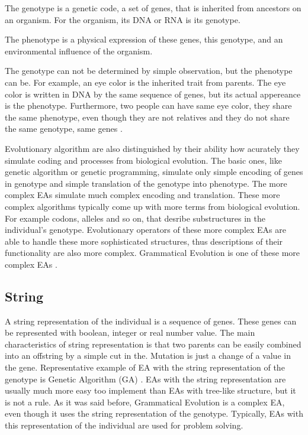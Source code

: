 The genotype is a genetic code, a set of genes, that is inherited from ancestors on an organism. For the organism, its DNA or RNA is its genotype.

The phenotype is a physical expression of these genes, this genotype, and an environmental influence of the organism.

The genotype can not be determined by simple observation, but the phenotype can be. For example, an eye color is the inherited trait from parents. The eye color is written in DNA by the same sequence of genes, but its actual appereance is the phenotype. Furthermore, two people can have same eye color, they share the same phenotype, even though they are not relatives and they do not share the same genotype, same genes \cite{genotype-phenotype}.

Evolutionary algorithm are also distinguished by their ability how acurately they simulate coding and processes from biological evolution. The basic ones, like genetic algorithm or genetic programming, simulate only simple encoding of genes in genotype and simple translation of the genotype into phenotype. The more complex EAs simulate much complex encoding and translation. These more complex algorithms typically come up with more terms from biological evolution. For example codons, alleles and so on, that desribe substructures in the individual's genotype. Evolutionary operators of these more complex EAs are able to handle these more sophisticated structures, thus descriptions of their functionality are also more complex. Grammatical Evolution is one of these more complex EAs \cite{grammatical-evolution}.

\subsection{String}
A string representation of the individual is a sequence of genes. These genes can be represented with boolean, integer or real number value.
The main characteristics of string representation is that two parents can be easily combined into an offstring by a simple cut in the. Mutation is just a change of a value in the gene. Representative example of EA with the string representation of the genotype is Genetic Algorithm (GA) \cite{evolutionary-algorithms}. EAs with the string representation are usually much more easy too implement than EAs with tree-like structure, but it is not a rule. As it was said before, Grammatical Evolution is a complex EA, even though it uses the string representation of the genotype. Typically, EAs with this representation of the individual are used for problem solving.

